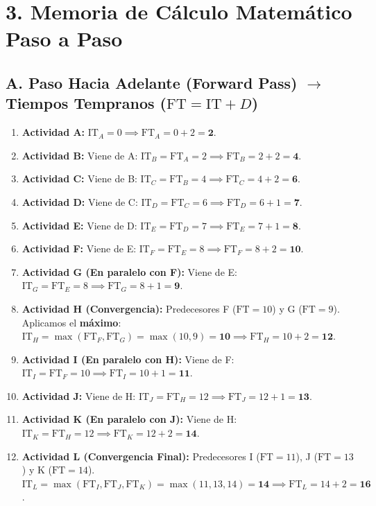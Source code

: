 \documentclass[11pt,a4paper]{article}
\begin{document}
\newpage

\section*{\normalsize\color{utiNavy}3. Memoria de Cálculo Matemático Paso a Paso}

\subsection*{\small\color{utiBlue}A. Paso Hacia Adelante (Forward Pass) $\rightarrow$ Tiempos Tempranos ($\text{FT} = \text{IT} + D$)}
\begin{enumerate}\setlength\itemsep{2pt}\footnotesize
    \item \textbf{Actividad A:} $\text{IT}_A = 0 \implies \text{FT}_A = 0 + 2 = \mathbf{2}$.
    \item \textbf{Actividad B:} Viene de A: $\text{IT}_B = \text{FT}_A = 2 \implies \text{FT}_B = 2 + 2 = \mathbf{4}$.
    \item \textbf{Actividad C:} Viene de B: $\text{IT}_C = \text{FT}_B = 4 \implies \text{FT}_C = 4 + 2 = \mathbf{6}$.
    \item \textbf{Actividad D:} Viene de C: $\text{IT}_D = \text{FT}_C = 6 \implies \text{FT}_D = 6 + 1 = \mathbf{7}$.
    \item \textbf{Actividad E:} Viene de D: $\text{IT}_E = \text{FT}_D = 7 \implies \text{FT}_E = 7 + 1 = \mathbf{8}$.
    \item \textbf{Actividad F:} Viene de E: $\text{IT}_F = \text{FT}_E = 8 \implies \text{FT}_F = 8 + 2 = \mathbf{10}$.
    \item \textbf{Actividad G (En paralelo con F):} Viene de E: $\text{IT}_G = \text{FT}_E = 8 \implies \text{FT}_G = 8 + 1 = \mathbf{9}$.
    \item \textbf{Actividad H (Convergencia):} Predecesores F ($\text{FT}=10$) y G ($\text{FT}=9$). Aplicamos el \textbf{máximo}:\\
    $\text{IT}_H = \max(\text{FT}_F, \text{FT}_G) = \max(10, 9) = \mathbf{10} \implies \text{FT}_H = 10 + 2 = \mathbf{12}$.
    \item \textbf{Actividad I (En paralelo con H):} Viene de F: $\text{IT}_I = \text{FT}_F = 10 \implies \text{FT}_I = 10 + 1 = \mathbf{11}$.
    \item \textbf{Actividad J:} Viene de H: $\text{IT}_J = \text{FT}_H = 12 \implies \text{FT}_J = 12 + 1 = \mathbf{13}$.
    \item \textbf{Actividad K (En paralelo con J):} Viene de H: $\text{IT}_K = \text{FT}_H = 12 \implies \text{FT}_K = 12 + 2 = \mathbf{14}$.
    \item \textbf{Actividad L (Convergencia Final):} Predecesores I ($\text{FT}=11$), J ($\text{FT}=13$) y K ($\text{FT}=14$).\\
    $\text{IT}_L = \max(\text{FT}_I, \text{FT}_J, \text{FT}_K) = \max(11, 13, 14) = \mathbf{14} \implies \text{FT}_L = 14 + 2 = \mathbf{16}$.
\end{enumerate}
\end{document}
